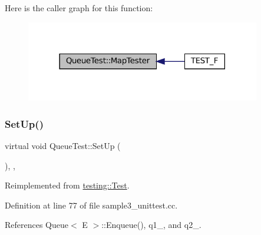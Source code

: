 Here is the caller graph for this function\+:
\nopagebreak
\begin{figure}[H]
\begin{center}
\leavevmode
\includegraphics[width=290pt]{classQueueTest_a7f1661cd16c428a130d6ac1e4246eaab_icgraph}
\end{center}
\end{figure}
\mbox{\label{classQueueTest_a91e69958f086239a523864d6b94ab174}} 
\subsubsection{\texorpdfstring{Set\+Up()}{SetUp()}\hspace{0.1cm}{\footnotesize\ttfamily [1/2]}}
{\footnotesize\ttfamily virtual void Queue\+Test\+::\+Set\+Up (\begin{DoxyParamCaption}{ }\end{DoxyParamCaption})\hspace{0.3cm}{\ttfamily [inline]}, {\ttfamily [protected]}, {\ttfamily [virtual]}}



Reimplemented from \hyperlink{classtesting_1_1Test_a57a4116f39f6636a80710ded7d42e889}{testing\+::\+Test}.



Definition at line 77 of file sample3\+\_\+unittest.\+cc.



References Queue$<$ E $>$\+::\+Enqueue(), q1\+\_\+, and q2\+\_\+.



